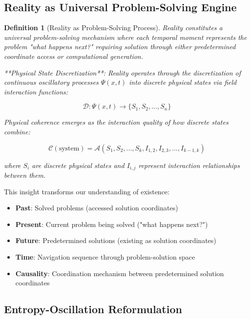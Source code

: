 \documentclass[12pt,a4paper]{article}
\newtheorem{definition}[theorem]{Definition}
\theoremstyle{remark}
\begin{document}
\subsection{Reality as Universal Problem-Solving Engine}

\begin{definition}[Reality as Problem-Solving Process]
Reality constitutes a universal problem-solving mechanism where each temporal moment represents the problem "what happens next?" requiring solution through either predetermined coordinate access or computational generation.

**Physical State Discretization**: Reality operates through the discretization of continuous oscillatory processes $\Psi(x,t)$ into discrete physical states via field interaction functions:

\begin{equation}
\mathcal{D}: \Psi(x,t) \rightarrow \{S_1, S_2, ..., S_n\}
\end{equation}

Physical coherence emerges as the interaction quality of how discrete states combine:

\begin{equation}
\mathcal{C}(\text{system}) = \mathcal{A}(S_1, S_2, ..., S_k, I_{1,2}, I_{2,3}, ..., I_{k-1,k})
\end{equation}

where $S_i$ are discrete physical states and $I_{i,j}$ represent interaction relationships between them.
\end{definition}

This insight transforms our understanding of existence:
\begin{itemize}
\item \textbf{Past}: Solved problems (accessed solution coordinates)
\item \textbf{Present}: Current problem being solved ("what happens next?")
\item \textbf{Future}: Predetermined solutions (existing as solution coordinates)
\item \textbf{Time}: Navigation sequence through problem-solution space
\item \textbf{Causality}: Coordination mechanism between predetermined solution coordinates
\end{itemize}

\subsection{Entropy-Oscillation Reformulation}
\end{document}
